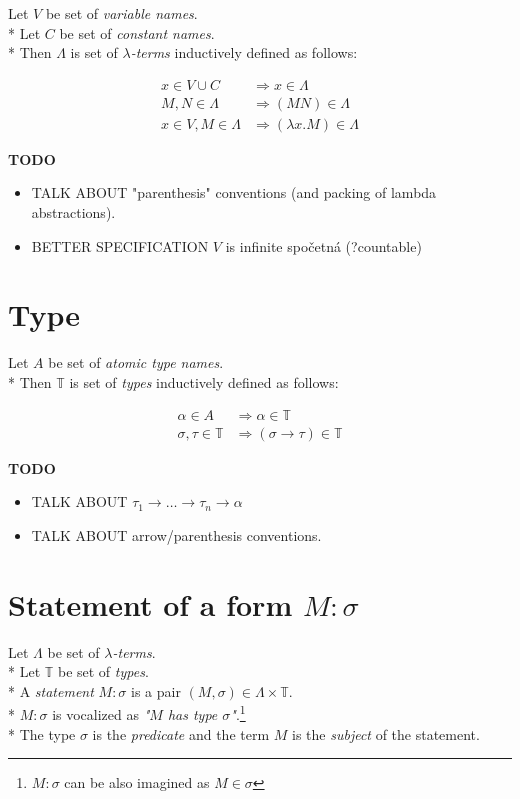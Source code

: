 \documentclass[12pt,a4paper]{report}
\newcommand{\lterms}{$\lambda$-terms\xspace}
\begin{document}
	Let $V$ be set of {\it variable names}.  \\* 
	Let $C$ be set of {\it constant names}.	 \\*		
	Then $\Lambda$ is set of {\it \lterms} inductively defined as follows:
	
	\begin{align*}
		 x   \in V \cup C          &\Rightarrow     x   \in \Lambda \\
		 M,N \in \Lambda           &\Rightarrow ( M N ) \in \Lambda \\
		 x   \in V , M \in \Lambda &\Rightarrow ( \lambda x . M ) \in \Lambda 
	\end{align*} 

	\textbf{TODO} 
	\begin{itemize} 
		\item TALK ABOUT "parenthesis" conventions (and packing of lambda abstractions).
		\item BETTER SPECIFICATION $V$ is infinite spočetná (?countable)
	\end{itemize}
	
\section{Type}
\label{deftype}

	Let $A$ be set of {\it atomic type names}. \\*
	Then $\mathbb{T}$ is set of {\it types} inductively defined as follows:
	
	\begin{align*}
	\alpha      \in A          &\Rightarrow     \alpha   \in \mathbb{T} \\
	\sigma,\tau \in \mathbb{T} &\Rightarrow ( \sigma \rightarrow  \tau ) \in \mathbb{T} 
	\end{align*} 

\textbf{TODO} 
\begin{itemize}
	\item TALK ABOUT $\tau_1 \rightarrow \dots \rightarrow \tau_n \rightarrow \alpha$ 
	\item TALK ABOUT arrow/parenthesis conventions. 
\end{itemize}
	
	
\section{Statement of a form $M : \sigma$}

	Let $\Lambda$ be set of {\it \lterms}. \\*
	Let $\mathbb{T}$ be set of {\it types}.       \\*
	A {\it statement} $M : \sigma$ is a pair $(M,\sigma) \in \Lambda \times \mathbb{T}$. \\*
	$M : \sigma$ is vocalized as {\it "$M$ has type $\sigma$"}.\footnote{ 
	$M : \sigma$ can be also imagined as $M \in \sigma$ } \\*
	The type $\sigma$ is the {\it predicate} and the term $M$ is the
	{\it subject} of the statement.  
	
\end{document}
